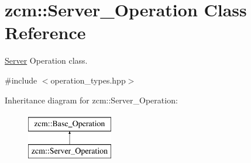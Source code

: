 \hypertarget{classzcm_1_1Server__Operation}{}\section{zcm\+:\+:Server\+\_\+\+Operation Class Reference}
\label{classzcm_1_1Server__Operation}


\hyperlink{classzcm_1_1Server}{Server} Operation class.  




{\ttfamily \#include $<$operation\+\_\+types.\+hpp$>$}

Inheritance diagram for zcm\+:\+:Server\+\_\+\+Operation\+:\begin{figure}[H]
\begin{center}
\leavevmode
\includegraphics[height=2.000000cm]{classzcm_1_1Server__Operation}
\end{center}
\end{figure}
